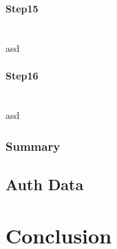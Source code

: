 \documentclass[a4paper, 11pt]{scrartcl}
\begin{document}
\paragraph{Step15}\hfill \\ 
asd
\paragraph{Step16}\hfill \\ 
asd
\subsubsection{Summary}

\subsection{Auth Data}
\label{sec:authData}


\section{Conclusion}



\clearpage

\printglossaries

\clearpage

\printbibliography[heading=bibintoc]
\end{document}
